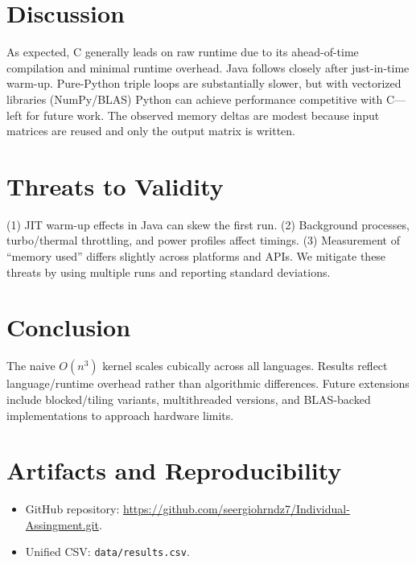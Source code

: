 \documentclass[11pt,a4paper]{article}
\begin{document}
\section{Discussion}
As expected, C generally leads on raw runtime due to its ahead-of-time compilation and minimal runtime overhead. Java follows closely after just-in-time warm-up. Pure-Python triple loops are substantially slower, but with vectorized libraries (NumPy/BLAS) Python can achieve performance competitive with C---left for future work. The observed memory deltas are modest because input matrices are reused and only the output matrix is written.

\section{Threats to Validity}
(1) JIT warm-up effects in Java can skew the first run. (2) Background processes, turbo/thermal throttling, and power profiles affect timings. (3) Measurement of ``memory used'' differs slightly across platforms and APIs. We mitigate these threats by using multiple runs and reporting standard deviations.

\section{Conclusion}
The naive $O(n^3)$ kernel scales cubically across all languages. Results reflect language/runtime overhead rather than algorithmic differences. Future extensions include blocked/tiling variants, multithreaded versions, and BLAS-backed implementations to approach hardware limits.

\section*{Artifacts and Reproducibility}
\begin{itemize}
  \item GitHub repository: \url{https://github.com/seergiohrndz7/Individual-Assingment.git}.
  \item Unified CSV: \texttt{data/results.csv}.
\end{itemize}



\end{document}
